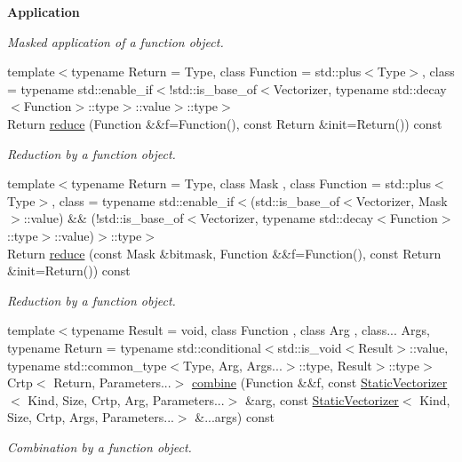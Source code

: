 \begin{Indent}{\bf Application}
\begin{DoxyCompactItemize}
\begin{DoxyCompactList}\small\item\em Masked application of a function object. \end{DoxyCompactList}\item 
{\footnotesize template$<$typename Return  = Type, class Function  = std\-::plus$<$\-Type$>$, class  = typename std\-::enable\-\_\-if$<$!std\-::is\-\_\-base\-\_\-of$<$\-Vectorizer, typename std\-::decay$<$\-Function$>$\-::type$>$\-::value$>$\-::type$>$ }\\Return \hyperlink{classmagrathea_1_1StaticVectorizer_ae9b48485c0550dcdf495ef70b4c36c09}{reduce} (Function \&\&f=Function(), const Return \&init=Return()) const 
\begin{DoxyCompactList}\small\item\em Reduction by a function object. \end{DoxyCompactList}\item 
{\footnotesize template$<$typename Return  = Type, class Mask , class Function  = std\-::plus$<$\-Type$>$, class  = typename std\-::enable\-\_\-if$<$(std\-::is\-\_\-base\-\_\-of$<$\-Vectorizer, Mask$>$\-::value) \&\& (!std\-::is\-\_\-base\-\_\-of$<$\-Vectorizer, typename std\-::decay$<$\-Function$>$\-::type$>$\-::value)$>$\-::type$>$ }\\Return \hyperlink{classmagrathea_1_1StaticVectorizer_ada52aff0e57fd3d7b464ed89f0a382dc}{reduce} (const Mask \&bitmask, Function \&\&f=Function(), const Return \&init=Return()) const 
\begin{DoxyCompactList}\small\item\em Reduction by a function object. \end{DoxyCompactList}\item 
{\footnotesize template$<$typename Result  = void, class Function , class Arg , class... Args, typename Return  = typename std\-::conditional$<$std\-::is\-\_\-void$<$\-Result$>$\-::value, typename std\-::common\-\_\-type$<$\-Type, Arg, Args...$>$\-::type, Result$>$\-::type$>$ }\\Crtp$<$ Return, Parameters...$>$ \hyperlink{classmagrathea_1_1StaticVectorizer_af9bfeab0127573058117a760e29d6fc6}{combine} (Function \&\&f, const \hyperlink{classmagrathea_1_1StaticVectorizer}{Static\-Vectorizer}$<$ Kind, Size, Crtp, Arg, Parameters...$>$ \&arg, const \hyperlink{classmagrathea_1_1StaticVectorizer}{Static\-Vectorizer}$<$ Kind, Size, Crtp, Args, Parameters...$>$ \&...args) const 
\begin{DoxyCompactList}\small\item\em Combination by a function object. \end{DoxyCompactList}\item 

\end{DoxyCompactItemize}
\end{Indent}
